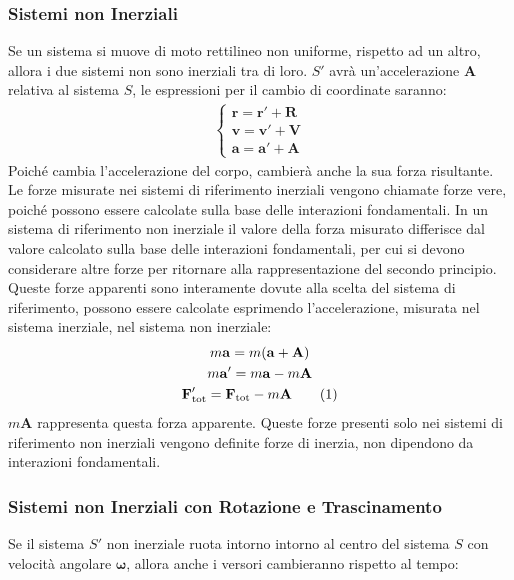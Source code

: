 \documentclass{article}
\newcommand{\vect}[1]{\boldsymbol{\mathbf{#1}}}
\numberwithin{equation}{subsection}
\begin{document}
\subsubsection{Sistemi non Inerziali}
Se un sistema si muove di moto rettilineo non uniforme, 
rispetto ad un altro, allora i due sistemi non sono inerziali tra di loro. 
$S'$ avrà un'accelerazione $\vect A$ relativa al sistema $S$, 
le espressioni per il cambio di coordinate saranno:
\begin{gather}
    \begin{cases}
        \vect{r}=\vect{r}'+\vect{R}\\
        \vect{v}=\vect{v}'+\vect{V}\\
        \vect{a}=\vect{a}'+\vect{A}
    \end{cases}
\end{gather}
Poiché cambia l'accelerazione del corpo, cambierà anche 
la sua forza risultante. Le forze misurate 
nei sistemi di riferimento inerziali vengono chiamate forze vere, poiché possono essere calcolate sulla base delle interazioni fondamentali. In un sistema di riferimento non 
inerziale il valore della forza misurato differisce dal valore calcolato sulla base delle interazioni fondamentali, per cui si devono considerare altre forze per ritornare 
alla rappresentazione del secondo principio. Queste forze apparenti sono interamente dovute alla scelta del sistema di riferimento, possono essere calcolate esprimendo 
l'accelerazione, misurata nel sistema inerziale, nel sistema non inerziale:  
\begin{gather*}
    m\vect{a}=m(\vect{a}+\vect{A})\\
    m\vect{a}'=m\vect{a}-m\vect{A}\\
    \vect{F}'_\mathrm{tot}=\vect{F}_\mathrm{tot}-m\vect{A}\tag{\stepcounter{equation}\theequation}
\end{gather*}
$m\vect{A}$ rappresenta questa forza apparente. Queste forze presenti solo nei sistemi di riferimento non inerziali vengono definite forze di inerzia, non dipendono 
da interazioni fondamentali.  

\subsubsection{Sistemi non Inerziali con Rotazione e Trascinamento}
Se il sistema $S'$ non inerziale ruota intorno intorno al centro del 
sistema $S$ con velocità angolare $\vect{\omega}$, allora anche i versori 
cambieranno rispetto al tempo:
\end{document}

